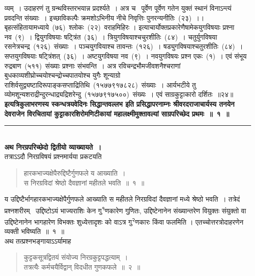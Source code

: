 \documentclass[11pt, openany]{book}
\begin{document}
\newpage
\thispagestyle{fancy}
\fancyhf{}
\noindent
व्यम्~। उदाहरणं तु ग्रन्थविस्तरभयान्न प्रदर्श्यते~। अत्र च \textendash\ पूर्वेण पूर्वेण गतेन युक्तं स्थानं विनाऽन्त्यं प्रवदन्ति संख्याः~। इच्छाविकल्पैः क्रमशोऽभिनीय नीचे निवृत्तिः पुनरन्यनीतिः~(२३)~।। बृहत्संहितायामध्याये~(७६)~श्लोकः~(२२)~वराहमिहिरः । इत्याचार्योक्तप्रकारेणैषामेकयुगविषयाः प्रश्ना नव~(९)~। द्वियुगविषयाः षट्त्रिंत~(३६)~। त्रियुगविषयाश्चचुरशीतिः~(८४)~। चतुर्युगविषया रसनेत्रचन्द्र~(१२६)~संख्याः~। पञ्चयुगवियाश्च तावन्तः~(१२६)~। षड्युगविषयाश्चतुरशीतिः~(८४)~। सप्तयुगविषयाः षट्त्रिंशत्~(३६)~। अष्टयुगविषया नव~(९)~। नवयुगविषयः प्रश्न एकः~(१)~। एवं संभूय रुद्रबाण~(५११)~संख्याः प्रश्नाः संभवन्ति~। अत्र रविचन्द्रभौमजीवशनैश्चराणां बुधकाव्यशीघ्रोच्चयोश्चन्द्रोच्चपातयोश्च युगैः शून्याग्रो राशिर्वसुद्व्यष्टादिरूपाङ्कसप्ताद्रितिथि~(१५७७९१७८२८)~संख्याः~। आर्यभटीये तु व्योमशून्यशराद्रीन्दुरन्धाद्र्यद्रिशरेन्दु~(१५७७९१७५००)~संख्यः~। एवं साग्रकुट्टाकारो दर्शितः~॥२४॥\\

\centering
\textbf{इत्यत्रिकुलाभरणस्य स्कन्धत्रयवेदिनः सिद्धान्तवल्लभ इति प्रसिद्धापरनाम्नः श्रीवरदराजाचार्यस्य तनयेन देवराजेन विरचितायां कुट्टाकारशिरोमणिटीकायां महालक्ष्मीमुक्तावल्यां साग्रपरिच्छेद प्रथमः~॥~१~॥\\}
\rule{0.2\linewidth}{1.0pt}\\

\vspace{1cm}
\justifying
\indent
\textbf{अथ निरग्रपरिच्छेदो द्वितीयो व्याख्यायते~। \\}
तत्राऽऽदौ निरग्रविषयं प्रश्नमार्यया प्रकटयति\textendash

\begin{quote}
{\ks हारकभाज्यक्षेपैरुद्दिष्टैर्गुणफले य आख्याति~।\\
स निरग्रविदां श्रेष्ठो दैवज्ञानां महीतले भवति~॥~१~॥}
\end{quote}

\indent
य उद्दिष्टैर्भागहारकभाज्यक्षेपैर्गुणफले आख्याति स महीतले निरग्रविदां दैवज्ञानां मध्ये श्रेष्ठो भवति~। तत्रेदं प्रश्नशरीरम् \textendash\ उद्दिष्टोऽयं भाज्यराशिः केन गु\textsuperscript {१}णकारेण गुणितः, उद्दिष्टेनानेन संख्यान्तरेण वियुक्तः संयुक्तो वा उद्दिष्टेनानेन भागहारेण विभक्तः शुध्येत्तादृशः को वाऽत्र गु\textsuperscript {२}णकारः किंवा फलमिति । एतच्चोत्तरत्रोदाहरणेन व्यक्ती भविष्यति~॥~१~॥\\
\indent
अथ तत्प्रश्नभङ्गायाऽऽर्यामाह\textendash
\begin{quote}
{\ks कुट्टकसूत्रद्वितयं संयोज्य निरग्रकुट्टपद्धत्याम्~।\\
तत्रत्यैः कर्मचयैर्विद्वान् विदधीत गुणकफले~॥~२~॥}
\end{quote}
\end{document}
